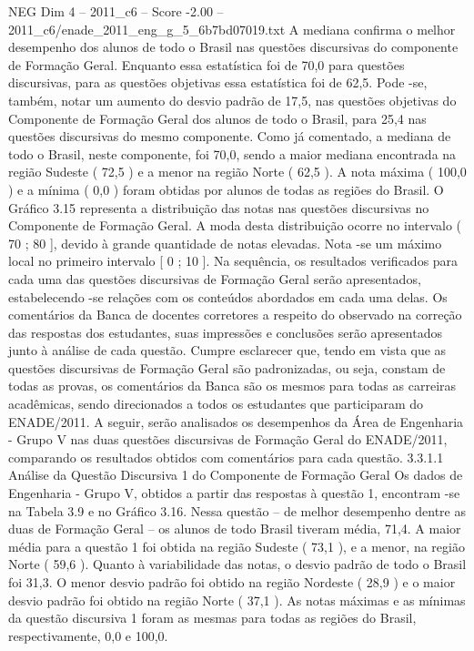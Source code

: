 \begin{textsample}{NEG Dim 4 – 2011\_c6 – Score -2.00 – 2011\_c6/enade\_2011\_eng\_g\_5\_6b7bd07019.txt}
A mediana confirma o melhor desempenho dos alunos de todo o Brasil nas questões discursivas do componente de Formação Geral.
Enquanto essa estatística foi de 70,0 para questões discursivas, para as questões objetivas essa estatística foi de 62,5.
Pode -se, também, notar um aumento do desvio padrão de 17,5, nas questões objetivas do Componente de Formação Geral dos alunos de todo o Brasil, para 25,4 nas questões discursivas do mesmo componente.
Como já comentado, a mediana de todo o Brasil, neste componente, foi 70,0, sendo a maior mediana encontrada na região Sudeste ( 72,5 ) e a menor na região Norte ( 62,5 ).
A nota máxima ( 100,0 ) e a mínima ( 0,0 ) foram obtidas por alunos de todas as regiões do Brasil.
O Gráfico 3.15 representa a distribuição das notas nas questões discursivas no Componente de Formação Geral.
A moda desta distribuição ocorre no intervalo ( 70 ; 80 ], devido à grande quantidade de notas elevadas.
Nota -se um máximo local no primeiro intervalo [ 0 ; 10 ].
Na sequência, os resultados verificados para cada uma das questões discursivas de Formação Geral serão apresentados, estabelecendo -se relações com os conteúdos abordados em cada uma delas.
Os comentários da Banca de docentes corretores a respeito do observado na correção das respostas dos estudantes, suas impressões e conclusões serão apresentados junto à análise de cada questão.
Cumpre esclarecer que, tendo em vista que as questões discursivas de Formação Geral são padronizadas, ou seja, constam de todas as provas, os comentários da Banca são os mesmos para todas as carreiras acadêmicas, sendo direcionados a todos os estudantes que participaram do ENADE/2011.
A seguir, serão analisados os desempenhos da Área de Engenharia - Grupo V nas duas questões discursivas de Formação Geral do ENADE/2011, comparando os resultados obtidos com comentários para cada questão. 3.3.1.1 Análise da Questão Discursiva 1 do Componente de Formação Geral Os dados de Engenharia - Grupo V, obtidos a partir das respostas à questão 1, encontram -se na Tabela 3.9 e no Gráfico 3.16.
Nessa questão – de melhor desempenho dentre as duas de Formação Geral – os alunos de todo Brasil tiveram média, 71,4.
A maior média para a questão 1 foi obtida na região Sudeste ( 73,1 ), e a menor, na região Norte ( 59,6 ).
Quanto à variabilidade das notas, o desvio padrão de todo o Brasil foi 31,3.
O menor desvio padrão foi obtido na região Nordeste ( 28,9 ) e o maior desvio padrão foi obtido na região Norte ( 37,1 ).
As notas máximas e as mínimas da questão discursiva 1 foram as mesmas para todas as regiões do Brasil, respectivamente, 0,0 e 100,0.

\end{textsample}
